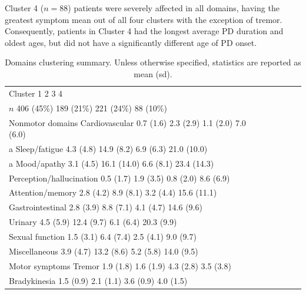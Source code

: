 \documentclass[preprint,5p]{elsarticle} %
\begin{document}
Cluster 4 ($n = 88$) patients were severely affected in all domains, having the greatest symptom
mean out of all four clusters with the exception of tremor. Consequently, patients in Cluster 4 had
the longest average PD duration and oldest ages, but did not have a significantly different age of
PD onset.

\begin{table}[t]
  \centering
  \caption{Domains clustering summary. Unless otherwise specified, statistics are
  reported as mean (sd).}
  \label{tab:nmd}
  \begin{threeparttable}
    \small
    \begin{tabular}{lrllll}
    \toprule
    	 Cluster 	 1 	 2 	 3 	 4 \\
    	 $n$ 	 406 (45\%) 	 189 (21\%) 	 221 (24\%) 	 88 (10\%) \\
    \midrule
    Nonmotor domains 	 Cardiovascular 	 0.7 (1.6)\tnote{24} 	 2.3 (2.9)\tnote{134} 	 1.1 (2.0)\tnote{24} 	
    7.0 (6.0)\tnote{123} \\
    a	 Sleep/fatigue 	 4.3 (4.8)\tnote{234} 	 14.9 (8.2)\tnote{134} 	 6.9 (6.3)\tnote{124} 21.0 (10.0)\tnote{123} \\
  	 a  Mood/apathy 	 3.1 (4.5)\tnote{234} 	 16.1 (14.0)\tnote{134} 	 6.6 (8.1)\tnote{124} 	 23.4 (14.3)\tnote{123} \\
    	 Perception/hallucination 	 0.5 (1.7)\tnote{24} 	 1.9 (3.5)\tnote{134} 	 0.8 (2.0)\tnote{24} 	 8.6 (6.9)\tnote{123} \\
    	 Attention/memory 	 2.8 (4.2)\tnote{24} 	 8.9 (8.1)\tnote{134} 	 3.2 (4.4)\tnote{24} 	15.6 (11.1)\tnote{123} \\
    	 Gastrointestinal 	 2.8 (3.9)\tnote{234} 	 8.8 (7.1)\tnote{134} 	 4.1 (4.7)\tnote{124} 	 14.6 (9.6)\tnote{123} \\
    	 Urinary 	 4.5 (5.9)\tnote{234} 	 12.4 (9.7)\tnote{134} 	 6.1 (6.4)\tnote{124} 	20.3 (9.9)\tnote{123} \\
    	 Sexual function 	 1.5 (3.1)\tnote{24} 	 6.4 (7.4)\tnote{134} 	 2.5 (4.1)\tnote{24} 	9.0 (9.7)\tnote{123} \\
    	 Miscellaneous 	 3.9 (4.7)\tnote{24} 	 13.2 (8.6)\tnote{13} 	 5.2 (5.8)\tnote{24} 	14.0 (9.5)\tnote{13} \\
    \midrule
    Motor symptoms 	 Tremor 	 1.9 (1.8)\tnote{34} 	 1.6 (1.9)\tnote{34} 	 4.3 (2.8)\tnote{124} 	 3.5 (3.8)\tnote{123} \\
    	 Bradykinesia 	 1.5 (0.9)\tnote{234} 	 2.1 (1.1)\tnote{134} 	 3.6 (0.9)\tnote{124} 	4.0 (1.5)\tnote{123} \\

\end{tabular}
\end{threeparttable}
\end{table}
\end{document}
